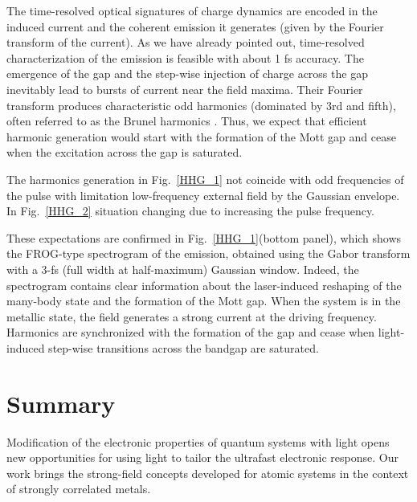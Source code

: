 The time-resolved optical signatures of charge dynamics are
encoded in the induced current and the 
coherent emission it generates (given 
by the Fourier transform of the current). As we have
already pointed out, time-resolved characterization of
the emission is feasible with about 1 fs accuracy.
The emergence of the gap and the step-wise injection of
charge across the gap inevitably lead to bursts
of current near the field maxima. Their Fourier transform
produces characteristic odd harmonics (dominated by
3rd and fifth), often referred to
as the Brunel harmonics \cite{Burnett_1989}. Thus, we expect that
efficient harmonic generation would start
with the formation of the Mott gap and cease when the excitation across the gap is saturated. 

The harmonics generation in Fig.~\ref{HHG_1} not coincide with odd frequencies of the pulse with limitation low-frequency external field by the Gaussian envelope. In Fig.~\ref{HHG_2} situation changing due to increasing the pulse frequency.


These expectations
are confirmed in Fig.~\ref{HHG_1}(bottom panel), which shows the FROG-type 
spectrogram of the emission, obtained using the Gabor transform
with a 3-fs (full width at half-maximum) Gaussian window. Indeed, the spectrogram contains clear information about the laser-induced reshaping of
the many-body state and the formation of the Mott gap. 
When the system is in the metallic state, the field
generates a strong current at the driving frequency. 
Harmonics are synchronized with the formation of
the gap and cease when light-induced step-wise transitions
across the bandgap are saturated. 



\section{Summary}

Modification of the electronic properties
of quantum systems with light opens new opportunities for
using light to tailor the ultrafast electronic response. 
Our work brings the strong-field concepts developed for
atomic systems in the context of strongly correlated
metals. 


